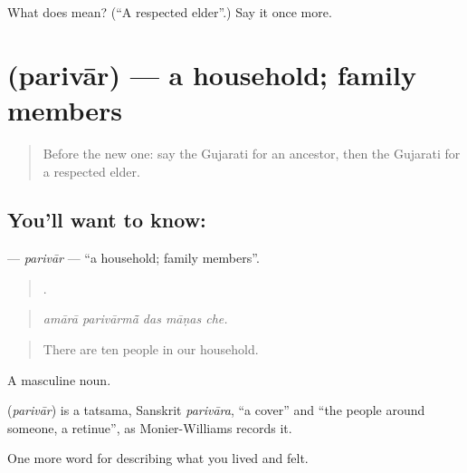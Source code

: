 \begin{tcolorbox}[breakable,colback=teal!4,colframe=teal!35!black,title={Before you move on}]
What does  mean? (\textquotedblleft{}A respected elder\textquotedblright{}.) Say it once more.
\end{tcolorbox}
\section[\texorpdfstring{\gu{પરિવાર} (parivār)}{પરિવાર (parivār)}]{ (parivār) — a household; family members}

\label{lesson:GU-C493-parivar}



\begin{quote}
Before the new one: say the Gujarati for an ancestor, then the Gujarati for a respected elder.
\end{quote}

\subsection*{You'll want to know: }
\textbf{} — \emph{parivār} — \textquotedblleft{}a household; family members\textquotedblright{}.

\begin{quote}
    .
\end{quote}

\begin{quote}
\emph{amārā parivārmā̃ das māṇas che.}
\end{quote}

\begin{quote}
There are ten people in our household.
\end{quote}

A masculine noun.

\begin{cousinweb}
\textbf{} (\emph{parivār}) is a tatsama, Sanskrit \emph{parivāra}, \textquotedblleft{}a cover\textquotedblright{} and \textquotedblleft{}the people around someone, a retinue\textquotedblright{}, as Monier-Williams records it.
\end{cousinweb}

\begin{grammarlens}[title={What you've built}]
One more word for describing what you lived and felt.
\end{grammarlens}

